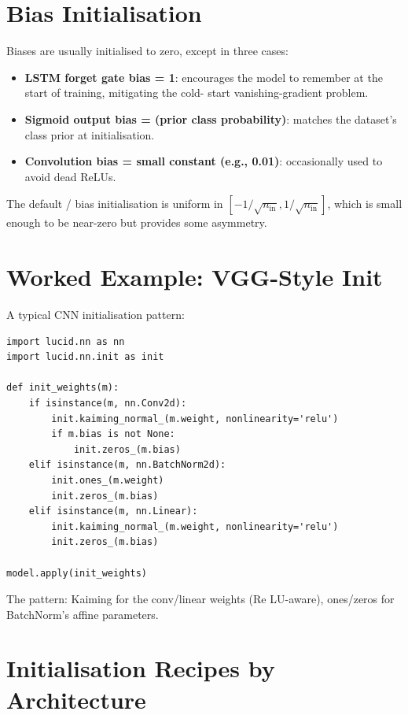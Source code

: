 \section{Bias Initialisation}
\label{sec:initialization:bias}

Biases are usually initialised to zero, except in three cases:

\begin{itemize}
  \item \textbf{LSTM forget gate bias = 1}: encourages the model
    to remember at the start of training, mitigating the cold-
    start vanishing-gradient problem.
  \item \textbf{Sigmoid output bias = (prior class
    probability)}: matches the dataset's class prior at
    initialisation.
  \item \textbf{Convolution bias = small constant (e.g., 0.01)}:
    occasionally used to avoid dead ReLUs.
\end{itemize}

The default  /  bias initialisation
is uniform in $[-1/\sqrt{n_{\text{in}}}, 1/\sqrt{n_{\text{in}}}]$,
which is small enough to be near-zero but provides some
asymmetry.

\section{Worked Example: VGG-Style Init}
\label{sec:initialization:vgg_example}

A typical CNN initialisation pattern:

\begin{lstlisting}[style=lucid,language=LucidPython]
import lucid.nn as nn
import lucid.nn.init as init

def init_weights(m):
    if isinstance(m, nn.Conv2d):
        init.kaiming_normal_(m.weight, nonlinearity='relu')
        if m.bias is not None:
            init.zeros_(m.bias)
    elif isinstance(m, nn.BatchNorm2d):
        init.ones_(m.weight)
        init.zeros_(m.bias)
    elif isinstance(m, nn.Linear):
        init.kaiming_normal_(m.weight, nonlinearity='relu')
        init.zeros_(m.bias)

model.apply(init_weights)
\end{lstlisting}

The pattern: Kaiming for the conv/linear weights (Re LU-aware),
ones/zeros for BatchNorm's affine parameters.

\section{Initialisation Recipes by Architecture}
\label{sec:initialization:recipes_by_arch}

